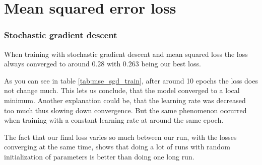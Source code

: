 \section{Mean squared error loss}
\subsubsection{Stochastic gradient descent}
When training with stochastic gradient descent and mean 
squared loss the loss always converged to around $0.28$ 
with $0.263$ being our best loss.

As you can see in table \ref*{tab:mse_sgd_train}, after around 10 epochs 
the loss does not change much.
This lets us conclude, that the model converged to a local minimum. Another explanation
could be, that the learning rate was decreased too much thus slowing down convergence. 
But the same phenomenon occurred when training with a constant learning rate at around 
the same epoch.

The fact that our final loss varies so much between our run, with the losses 
converging at the same time, shows that doing a lot of runs with random 
initialization of parameters is better than doing one long run.


